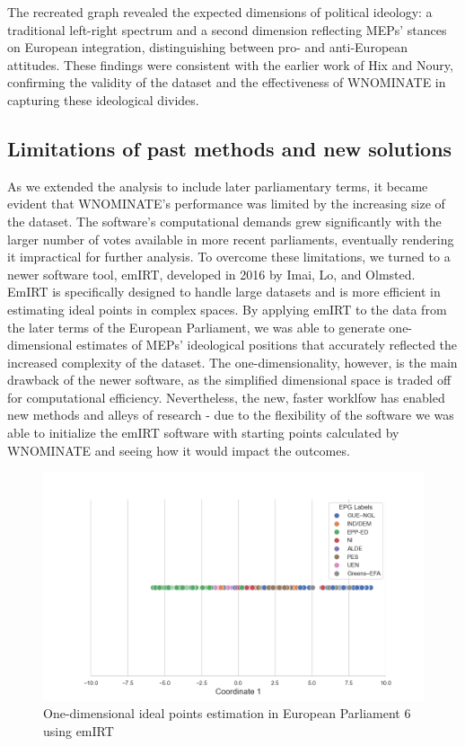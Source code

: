\documentclass{article}
\begin{document}
    The recreated graph revealed the expected dimensions of political ideology: a traditional left-right spectrum and a
    second dimension reflecting MEPs' stances on European integration, distinguishing between pro- and anti-European
    attitudes. These findings were consistent with the earlier work of Hix and Noury, confirming the validity of the
    dataset and the effectiveness of WNOMINATE in capturing these ideological divides.

    \subsection{Limitations of past methods and new solutions}
    As we extended the analysis to include later parliamentary terms, it became evident that WNOMINATE's performance was
    limited by the
    increasing size of the dataset. The software's computational demands grew significantly with the larger number of
    votes available in more recent parliaments, eventually rendering it impractical for further analysis.
    To overcome these limitations, we turned to a newer software tool, emIRT, developed in 2016 by Imai, Lo, and
    Olmsted.
    EmIRT is specifically designed to handle large datasets and is more efficient in estimating ideal points in complex
    spaces. By applying emIRT to the data from the later terms of the European Parliament, we was able to generate
    one-dimensional estimates of MEPs' ideological positions that accurately reflected the increased complexity of the
    dataset. The one-dimensionality, however, is the main drawback of the newer software, as the simplified
    dimensional space is traded off for computational efficiency. Nevertheless, the new, faster worklfow has enabled
    new methods and alleys of research - due to the flexibility of the software we was able to initialize the emIRT
    software with starting points calculated by WNOMINATE and seeing how it would impact the outcomes.

    \begin{figure}[H]
        \centering
        \includegraphics[width=1\textwidth]{Graphs/emIRT.png}
        \caption{One-dimensional ideal points estimation in European Parliament 6 using emIRT}
        \label{fig:emIRT}
    \end{figure}
\end{document}
